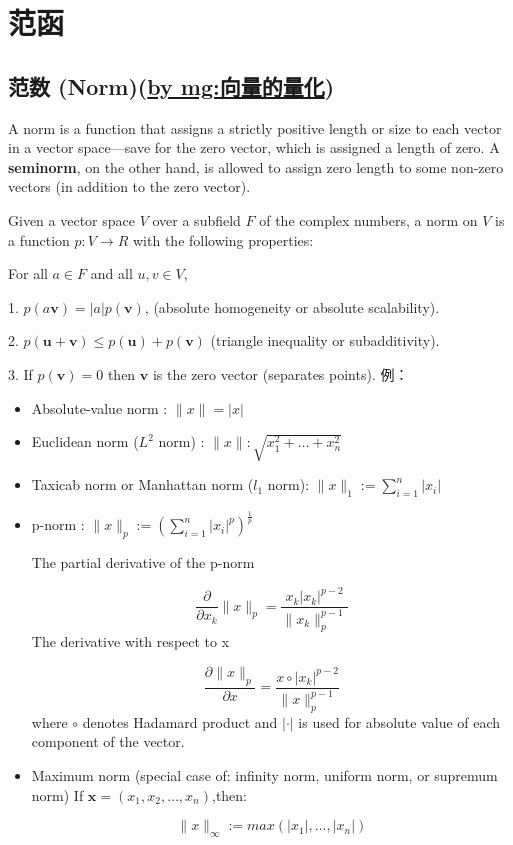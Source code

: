 \section{范函}

\subsection{范数 (Norm)(\underline{by mg:向量的量化})}
\cite{_norm_????}
A norm is a function that assigns a strictly positive length or size to each vector in a vector space—save for the zero vector, which is assigned a length of zero. A \textbf{seminorm}, on the other hand, is allowed to assign zero length to some non-zero vectors (in addition to the zero vector).\par
Given a vector space $V$ over a subfield $F$ of the complex numbers, a norm on $V$ is a function $p: V \rightarrow R$ with the following properties:\par
For all $a\in F$ and all $u, v \in V$,\par
1. $p(a\bm v) = |a| p(\bm v)$, (absolute homogeneity or absolute scalability).\par
2. $p(\bm u + \bm v) \leq p(\bm u) + p(\bm v)$ (triangle inequality or subadditivity).\par
3. If $p(\bm v) = 0$ then $\bm v$ is the zero vector (separates points).
例：\par
\begin{itemize}
\item{Absolute-value norm : $\|x\|=|x|$} 
\item{Euclidean norm ($L^2$ norm) : $ \|x\| : \sqrt{x_1^2+\dots+x_n^2}$ }
\item{Taxicab norm or Manhattan norm ($l_1$ norm): $\|x\|_1 := \sum_{i=1}^n |x_i|$}
\item{p-norm : $\|x\|_p := \left( \sum_{i=1}^n |x_i|^p \right) ^\frac{1}{p}$ }\par
The partial derivative of the p-norm \par
\[ \frac{\partial}{\partial x_k} \|x\|_p = \frac{x_k |x_k|^{p-2}}{\|x_k\|_p^{p-1}} \]
The derivative with respect to x \par
\[ \frac{\partial \|x\|_p}{\partial x} = \frac{x \circ |x_k|^{p-2}}{\|x\|_p^{p-1}} \]
where $\circ$ denotes Hadamard product and $|\cdot|$ is used for absolute value of each component of the vector.
\item{Maximum norm (special case of: infinity norm, uniform norm, or supremum norm)}
If $\bm x=(x_1,x_2,\dots,x_n)$,then:\par
\[ \|x\|_\infty := max(|x_1|,\dots,|x_n|) \]
\end{itemize}


